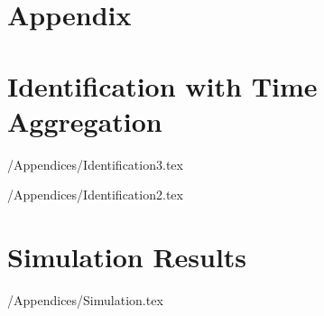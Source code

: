 \documentclass[titlepage]{\econtex}\newcommand{\texname}{IncomeUncertainty}
\begin{document}
\processdelayedfloats

\small

\normalsize

\pagebreak
\appendix

\section*{Appendix}

\section{Identification with Time Aggregation}\label{sec:Identification}

\econtexRoot/Appendices/Identification3.tex

\econtexRoot/Appendices/Identification2.tex

\section{Simulation Results}\label{sec:Simulation}
\econtexRoot/Appendices/Simulation.tex
\end{document}
